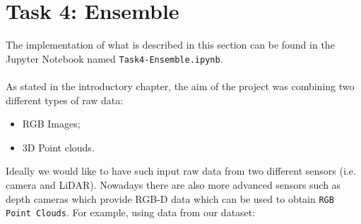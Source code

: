 \documentclass[11pt,a4paper]{article}
\begin{document}
\newpage
\section{Task 4: Ensemble}
The implementation of what is described in this section can be found in the Jupyter Notebook named \texttt{Task4-Ensemble.ipynb}.\\
\\
As stated in the introductory chapter, the aim of the project was combining two different types of raw data:
\begin{itemize}
    \item RGB Images;
    \item 3D Point clouds.
\end{itemize}
Ideally we would like to have such input raw data from two different sensors (i.e. camera and LiDAR). Nowadays there are also more advanced sensors such as depth cameras which provide RGB-D data which can be used to obtain \texttt{RGB Point Clouds}. For example, using data from our dataset:
\setcounter{subfigure}{0}
\end{document}
